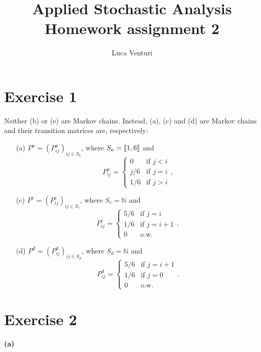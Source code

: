 \documentclass[a4paper,11pt]{article}
\theoremstyle{definition}
\theoremstyle{plain}
\theoremstyle{remark}
\DeclarePairedDelimiter{\parqq}{\llbracket}{\rrbracket}
\begin{document}
\title{Applied Stochastic Analysis \\ Homework assignment 2}
\author{Luca Venturi}
\maketitle

\section*{Exercise 1}

Neither (b) or (e) are Markov chains. Instead, (a), (c) and (d) are Markov chains and their transition matrices are, respectively:
\begin{enumerate}
\item[(a)] $P^a= (P^a_{ij})_{ij\in S_a}$, where $S_a=\parqq{1,6}$ and 
$$
P^a_{ij} = \left\{ \begin{array}{ll}
0 & \text{if } j < i \\
j/6 & \text{if } j = i \\
1/6 & \text{if } j > i
\end{array}\right. ,
$$
\item[(c)] $P^c= (P^c_{ij})_{ij\in S_c}$, where $S_c=\mathbb{N}$ and 
$$
P^c_{ij} = \left\{ \begin{array}{ll}
5/6 & \text{if } j = i \\
1/6 & \text{if } j = i+1 \\
0 & \text{o.w.}
\end{array}\right. ,
$$ 
\item[(d)] $P^d= (P^d_{ij})_{ij\in S_d}$, where $S_d=\mathbb{N}$ and 
$$
P^d_{ij} = \left\{ \begin{array}{ll}
5/6 & \text{if } j = i+1 \\
1/6 & \text{if } j = 0 \\
0 & \text{o.w.}
\end{array}\right. . 
$$ 
\end{enumerate} 

\section*{Exercise 2}

\paragraph*{(a)}
\end{document}
